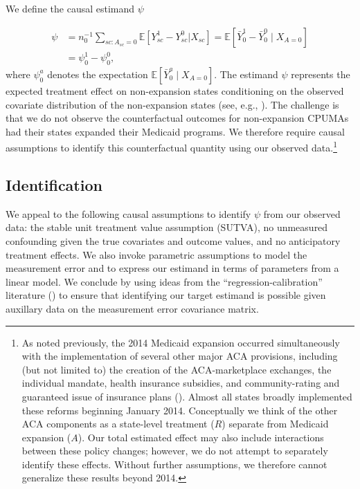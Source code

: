 \documentclass[aoas]{imsart}
\theoremstyle{plain}
\theoremstyle{remark}
\begin{document}
We define the causal estimand $\psi$

\begin{align} \label{eqn:psi}
    \psi &= n_0^{-1} \sum_{sc: A_{sc}=0} \mathbb{E}\left[ Y_{sc}^1 - Y_{sc}^0 | X_{sc}\right] = \mathbb{E}[\bar{Y}_0^1 - \bar{Y}_0^0 \mid X_{A=0}] \\ 
    &= \psi_0^1 - \psi_0^0,
\end{align}
where $\psi_0^a$ denotes the expectation $\mathbb{E}[\bar{Y}_0^a \mid X_{A=0}]$. The estimand $\psi$ represents the expected treatment effect on non-expansion states conditioning on the observed covariate distribution of the non-expansion states (see, e.g., \cite{imbens2004nonparametric}). The challenge is that we do not observe the counterfactual outcomes for non-expansion CPUMAs had their states expanded their Medicaid programs. We therefore require causal assumptions to identify this counterfactual quantity using our observed data.\footnote{As noted previously, the 2014 Medicaid expansion occurred simultaneously with the implementation of several other major ACA provisions, including (but not limited to) the creation of the ACA-marketplace exchanges, the individual mandate, health insurance subsidies, and community-rating and guaranteed issue of insurance plans (\cite{courtemanche2017early}). Almost all states broadly implemented these reforms beginning January 2014. Conceptually we think of the other ACA components as a state-level treatment ($R$) separate from Medicaid expansion ($A$). Our total estimated effect may also include interactions between these policy changes; however, we do not attempt to separately identify these effects. Without further assumptions, we therefore cannot generalize these results beyond 2014.} 

\subsection{Identification} \label{ssec:identification}

We appeal to the following causal assumptions to identify $\psi$ from our observed data: the stable unit treatment value assumption (SUTVA), no unmeasured confounding given the true covariates and outcome values, and no anticipatory treatment effects. We also invoke parametric assumptions to model the measurement error and to express our estimand in terms of parameters from a linear model. We conclude by using ideas from the ``regression-calibration'' literature (\cite{gleser1992importance}) to ensure that identifying our target estimand is possible given auxillary data on the measurement error covariance matrix.
\end{document}
